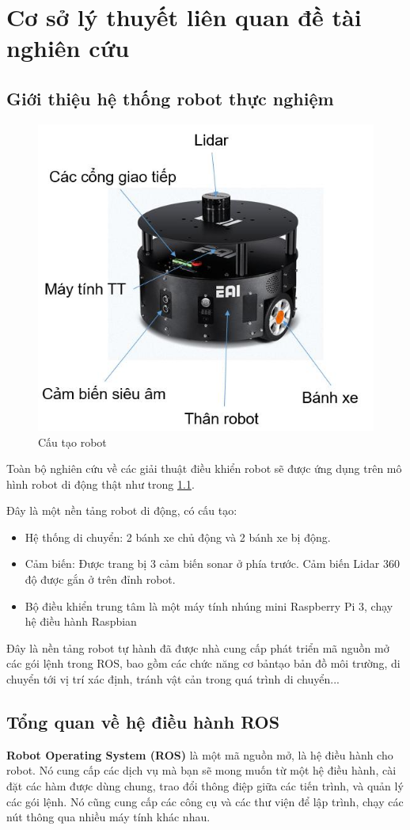 \chapter{Cơ sở lý thuyết liên quan đề tài nghiên cứu}

\section{Giới thiệu hệ thống robot thực nghiệm}
\begin{figure}[tph]
	\centering
	\includegraphics[width=0.7\linewidth]{chapter1/figs/eaiD1}
	\caption{Cấu tạo robot}
	\label{fig:eaid1}
\end{figure}

Toàn bộ nghiên cứu về các giải thuật điều khiển robot sẽ được ứng dụng trên mô hình robot di động thật như trong \figurename{\ref{fig:eaid1}}. 

Đây là một nền tảng robot di động, có cấu tạo:
\begin{itemize}
	\item Hệ thống di chuyển: 2 bánh xe chủ động và 2 bánh xe bị động. 
	\item Cảm biến: Được trang bị 3 cảm biến sonar ở phía trước. Cảm biến Lidar 360 độ được gắn ở trên đỉnh robot.
	\item Bộ điều khiển trung tâm là một máy tính nhúng mini Raspberry Pi 3, chạy hệ điều hành Raspbian	
\end{itemize}

Đây là nền tảng robot tự hành đã được nhà cung cấp phát triển mã nguồn mở các gói lệnh trong ROS, bao gồm các chức năng cơ bảntạo bản đồ môi trường, di chuyển tới vị trí xác định, tránh vật cản trong quá trình di chuyển...


\section{Tổng quan về hệ điều hành ROS}
\textbf{Robot Operating System (ROS)} là một mã nguồn mở, là hệ điều hành cho robot. Nó cung cấp các dịch vụ mà bạn sẽ mong muốn từ một hệ điều hành, cài đặt các hàm được dùng chung, trao đổi thông điệp giữa các tiến trình, và quản lý các gói lệnh. Nó cũng cung cấp các công cụ và các thư viện để lập trình, chạy các nút thông qua nhiều máy tính khác nhau. 

